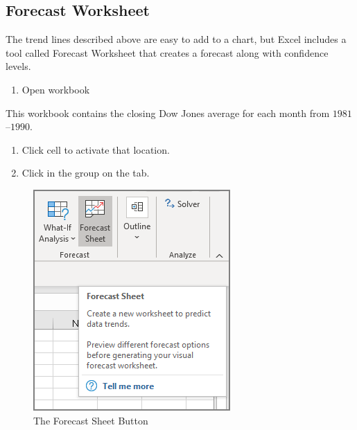 \subsection{Forecast Worksheet}

The trend lines described above are easy to add to a chart, but Excel includes a tool called Forecast Worksheet that creates a forecast along with confidence levels.

\begin{enumerate}
	\item Open workbook 
\end{enumerate}

This workbook contains the closing Dow Jones average for each month from $ 1981 $–$ 1990 $.

\begin{enumerate}[resume]
	\item Click cell  to activate that location.
	\item Click  in the  group on the  tab.

\end{enumerate}

\begin{figure}[H]
	\centering
	\includegraphics[width=\maxwidth{.95\linewidth}]{gfx/ch08_fig12}
	\caption{The Forecast Sheet Button}
	\label{08:fig12}
\end{figure}

